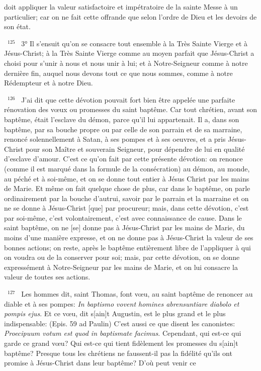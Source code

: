 \documentclass[paper=a5,pagesize=pdftex,fontsize=15pt,headinclude=on,twoside=off]{scrbook}
\newcommand{\negphantom}[1]{\settowidth{\dimen0}{#1}\hspace*{-\dimen0}}
\newcommand{\versenb}[1]{\par \vspace{10pt}~\negphantom{~${}^{#1}$~}${}^{#1}$~}
\newcommand{\latin}[1]{\emph{#1}}
\begin{document}
doit appliquer la valeur satisfactoire et impétratoire de la sainte Messe à un particulier; car on ne fait cette offrande
que selon l'ordre de Dieu et les devoirs de son état.
\versenb{125} 3° Il s'ensuit qu'on se consacre tout ensemble à la Très Sainte Vierge et à Jésus-Christ; à la Très Sainte
Vierge comme au moyen parfait que Jésus-Christ a choisi pour s'unir à nous et nous unir à lui; et à Notre-Seigneur
comme à notre dernière fin, auquel nous devons tout ce que nous sommes, comme à notre Rédempteur et à notre
Dieu.
\versenb{126} J'ai dit que cette dévotion pouvait fort bien être appelée une parfaite rénovation des vœux ou promesses du
saint baptême.
Car tout chrétien, avant son baptême, était l'esclave du démon, parce qu'il lui appartenait. Il a, dans son baptême,
par sa bouche propre ou par celle de son parrain et de sa marraine, renoncé solennellement à Satan, à ses
pompes et à ses oeuvres, et a pris Jésus-Christ pour son Maître et souverain Seigneur, pour dépendre de lui en
qualité d'esclave d'amour. C'est ce qu'on fait par cette présente dévotion: on renonce (comme il est marqué dans
la formule de la consécration) au démon, au monde, au péché et à soi-même, et on se donne tout entier à Jésus Christ par les mains de Marie. Et même on fait quelque chose de plus, car dans le baptême, on parle
ordinairement par la bouche d'autrui, savoir par le parrain et la marraine et on ne se donne à Jésus-Christ [que]
par procureur; mais, dans cette dévotion, c'est par soi-même, c'est volontairement, c'est avec connaissance de
cause.
Dans le saint baptême, on ne [se] donne pas à Jésus-Christ par les mains de Marie, du moins d'une manière
expresse, et on ne donne pas à Jésus-Christ la valeur de ses bonnes actions; on reste, après le baptême
entièrement libre de l'appliquer à qui on voudra ou de la conserver pour soi; mais, par cette dévotion, on se donne
expressément à Notre-Seigneur par les mains de Marie, et on lui consacre la valeur de toutes ses actions.
\versenb{127} Les hommes dit, saint Thomas, font vœu, au saint baptême de renoncer au diable et à ses pompes: \latin{In
baptismo vovent homines abrensuntiare diabolo et pompis ejus}. Et ce vœu, dit s[ain]t Augustin, est le plus grand
et le plus indispensable:  (Epis. 59 ad Paulin)
C'est aussi ce que disent les canonistes: \latin{Proecipuum votum est quod in baptismate facimus}. Cependant, qui est-ce qui garde ce grand vœu? Qui est-ce qui tient fidèlement les promesses du s[ain]t baptême? Presque tous les
chrétiens ne faussent-il pas la fidélité qu'ils ont promise à Jésus-Christ dans leur baptême? D'où peut venir ce
\end{document}
